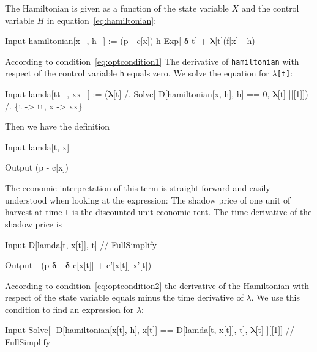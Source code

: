 \documentclass[11pt,fleqn]{book} %
\begin{document}
\begin{theorem} 
\hfill \break
The Hamiltonian is given as a function of the state variable $X$ and the control variable $H$ in equation~\ref{eq:hamiltonian}:
  
\begin{mmaCell}[index=1]{Input}
  hamiltonian[x_, h_] := (p - c[x]) h Exp[-\(\pmb{\delta}\) t] + \(\pmb{\lambda}\)[t](f[x] - h)
\end{mmaCell}
According to condition~\ref{eq:optcondition1} The derivative of \texttt{hamiltonian} with respect of the control variable \texttt{h} equals zero. We solve the equation for \texttt{$\lambda$[t]}:
\begin{mmaCell}{Input}
  lamda[tt_, xx_] := (\(\pmb{\lambda}\)[t] /. Solve[
        D[hamiltonian[x, h], h] == 0, \(\pmb{\lambda}\)[t]
      ][[1]]) /. \{t -> tt, x -> xx\}
\end{mmaCell}
Then we have the definition
\begin{mmaCell}{Input}
  lamda[t, x]
\end{mmaCell}
\begin{mmaCell}{Output}
   (p - c[x])
\end{mmaCell}
The economic interpretation of this term is straight forward and easily understood when looking at the expression: The shadow price of one unit of harvest at time \texttt{t} is the discounted unit economic rent. The time derivative of the shadow price is
\begin{mmaCell}{Input}
  D[lamda[t, x[t]], t] // FullSimplify 
\end{mmaCell}
\begin{mmaCell}{Output}
  - (p \(\pmb{\delta}\) - \(\pmb{\delta}\) c[x[t]] + c'[x[t]] x'[t])
\end{mmaCell}
According to condition~\ref{eq:optcondition2} the derivative of the Hamiltonian with respect of the state variable equals minus the time derivative of $\lambda$. We use this condition to find an expression for $\lambda$:
\begin{mmaCell}{Input}
  Solve[
    -D[hamiltonian[x[t], h], x[t]] == D[lamda[t, x[t]], t], \(\pmb{\lambda}\)[t]
  ][[1]] // FullSimplify
\end{mmaCell}

\end{theorem}
\end{document}
